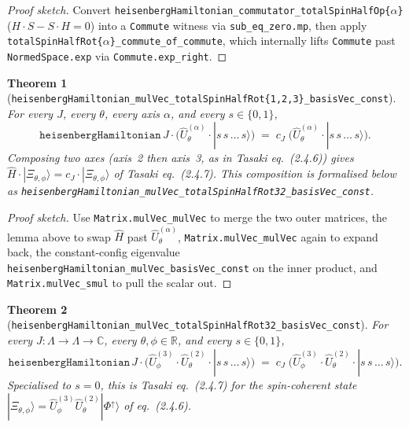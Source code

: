 \documentclass[a4paper,11pt]{article}
\newtheorem{theorem}{Theorem}
\begin{document}
\begin{proof}[Proof sketch]
Convert
\texttt{heisenbergHamiltonian\_commutator\_totalSpinHalfOp\{$\alpha$\}}
($H\cdot S - S\cdot H = 0$) into a \texttt{Commute} witness via
\texttt{sub\_eq\_zero.mp}, then apply
\texttt{totalSpinHalfRot\{$\alpha$\}\_commute\_of\_commute}, which
internally lifts \texttt{Commute} past
\texttt{NormedSpace.exp} via \texttt{Commute.exp\_right}.
\end{proof}

\begin{theorem}[\texttt{heisenbergHamiltonian\_mulVec\_totalSpinHalfRot\{1,2,3\}\_basisVec\_const}]
For every $J$, every $\theta$, every axis $\alpha$, and every
$s \in \{0,1\}$,
\[
  \texttt{heisenbergHamiltonian}\,J \cdot
    \bigl(\hat U^{(\alpha)}_{\theta} \cdot
            |s\,s\,\dots\,s\rangle\bigr)
  \;=\;
  c_{J}\;
    \bigl(\hat U^{(\alpha)}_{\theta} \cdot
            |s\,s\,\dots\,s\rangle\bigr).
\]
Composing two axes (axis~2 then axis~3, as in Tasaki eq.~(2.4.6)) gives
$\hat H \cdot |\Xi_{\theta,\phi}\rangle
   = c_{J} \cdot |\Xi_{\theta,\phi}\rangle$
of Tasaki eq.~(2.4.7).  This composition is formalised below as
\texttt{heisenbergHamiltonian\_mulVec\_totalSpinHalfRot32\_basisVec\_const}.
\end{theorem}

\begin{proof}[Proof sketch]
Use \texttt{Matrix.mulVec\_mulVec} to merge the two outer matrices,
the lemma above to swap $\hat H$ past $\hat U^{(\alpha)}_{\theta}$,
\texttt{Matrix.mulVec\_mulVec} again to expand back, the
constant-config eigenvalue
\texttt{heisenbergHamiltonian\_mulVec\_basisVec\_const} on the inner
product, and \texttt{Matrix.mulVec\_smul} to pull the scalar out.
\end{proof}

\begin{theorem}[\texttt{heisenbergHamiltonian\_mulVec\_totalSpinHalfRot32\_basisVec\_const}]
For every $J : \Lambda \to \Lambda \to \mathbb{C}$, every
$\theta,\phi \in \mathbb{R}$, and every $s \in \{0,1\}$,
\[
  \texttt{heisenbergHamiltonian}\,J \cdot
    \bigl(\hat U^{(3)}_{\phi} \cdot \hat U^{(2)}_{\theta}
            \cdot |s\,s\,\dots\,s\rangle\bigr)
  \;=\;
  c_{J}\;
    \bigl(\hat U^{(3)}_{\phi} \cdot \hat U^{(2)}_{\theta}
            \cdot |s\,s\,\dots\,s\rangle\bigr).
\]
Specialised to $s = 0$, this is Tasaki eq.~(2.4.7) for the
spin-coherent state $|\Xi_{\theta,\phi}\rangle = \hat U^{(3)}_{\phi}
\hat U^{(2)}_{\theta} |\Phi^{\uparrow}\rangle$ of eq.~(2.4.6).
\end{theorem}
\end{document}

